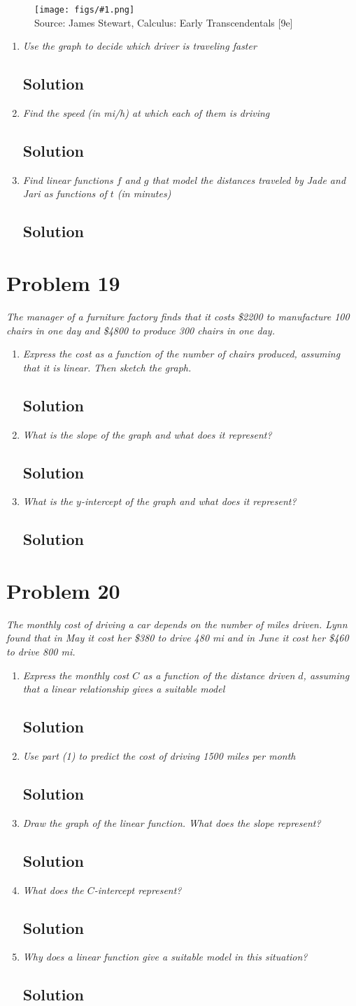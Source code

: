 \documentclass[11pt]{article}
\newcommand{\soln}{\subsection*}
\newcommand{\qn}{\textit}
\newcommand{\imagesource}[1]{{\footnotesize Source: #1}}
\newcommand{\imgqn}[1]{
	\begin{figure}[H]
		\centering
		\texttt{[image: figs/\#1.png]}\\
		\imagesource{James Stewart, Calculus: Early Transcendentals [9e]}
	\end{figure}
}
\begin{document}
\imgqn{1.2.18}

\begin{enumerate}
	\item \qn{Use the graph to decide which driver is traveling faster}
	\soln{Solution}
	
	\item \qn{Find the speed (in mi/h) at which each of them is driving}
	\soln{Solution}
	
	\item \qn{Find linear functions $f$ and $g$ that model the distances traveled by Jade and Jari as functions of $t$ (in minutes)}
	\soln{Solution}
\end{enumerate}

\section*{Problem 19}

\qn{The manager of a furniture factory finds that it costs \$2200 to manufacture 100 chairs in one day and \$4800 to produce 300 chairs in one day.}

\begin{enumerate}
	\item \qn{Express the cost as a function of the number of chairs produced, assuming that it is linear. Then sketch the graph.}
	\soln{Solution}
	
	\item \qn{What is the slope of the graph and what does it represent?}
	\soln{Solution}
	
	\item \qn{What is the $y$-intercept of the graph and what does it represent?}
	\soln{Solution}
\end{enumerate}

\section*{Problem 20}

\qn{The monthly cost of driving a car depends on the number of miles driven. Lynn found that in May it cost her \$380 to drive 480 mi and in June it cost her \$460 to drive 800 mi.}

\begin{enumerate}
	\item \qn{Express the monthly cost $C$ as a function of the distance driven $d$, assuming that a linear relationship gives a suitable model}
	\soln{Solution}
	
	\item \qn{Use part (1) to predict the cost of driving 1500 miles per month}
	\soln{Solution}
	
	\item \qn{Draw the graph of the linear function. What does the slope represent?}
	\soln{Solution}
	
	\item \qn{What does the $C$-intercept represent?}
	\soln{Solution}
	
	\item \qn{Why does a linear function give a suitable model in this situation?}
	\soln{Solution}
\end{enumerate}
\end{document}
